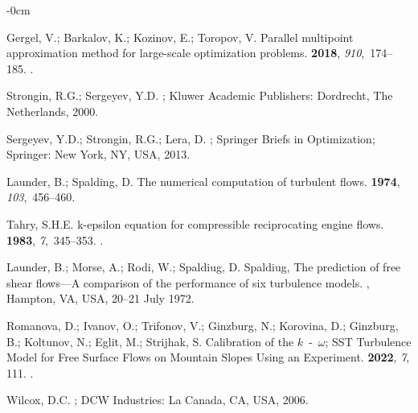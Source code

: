 \documentclass[mathematics,article,accept,pdftex,moreauthors]{Definitions/mdpi}
\begin{document}
\begin{adjustwidth}{-\extralength}{0cm}
\begin{thebibliography}{999}
Gergel, V.; Barkalov, K.; Kozinov, E.; Toropov, V.
\newblock Parallel multipoint approximation method for large-scale optimization
  problems.
 {\bf 2018},
  {\em 910},~174--185.
.

{Strongin, R.G.; Sergeyev, Y.D.} 
; Kluwer Academic Publishers: Dordrecht,   The Netherlands, 2000.

{Sergeyev, Y.D.; Strongin, R.G.;  Lera, D.} 
; Springer Briefs in Optimization;  Springer: New York, NY, USA,   2013.

Launder, B.; Spalding, D.
\newblock The numerical computation of turbulent flows.
 {\bf 1974}, {\em
  103},~456--460.

Tahry, S.H.E.
\newblock k-epsilon equation for compressible reciprocating engine flows.
 {\bf 1983}, {\em 7},~345--353.
.

Launder, B.; Morse, A.; Rodi, W.; Spaldiug, D.
\newblock Spaldiug, The prediction of free shear flows---A comparison of the
  performance of six turbulence models.
, Hampton, VA, USA,  20--21 July 1972.

Romanova, D.; Ivanov, O.; Trifonov, V.; Ginzburg, N.; Korovina, D.; Ginzburg,
  B.; Koltunov, N.; Eglit, M.; Strijhak, S.
\newblock Calibration of the $k$~-~$\omega$; SST Turbulence Model for Free
  Surface Flows on Mountain Slopes Using an Experiment.
 {\bf 2022}, {\em 7}, 111.
.

Wilcox, D.C.
;   DCW Industries: La Canada, CA, USA, 2006. 


\end{thebibliography}
\end{adjustwidth}
\end{document}
